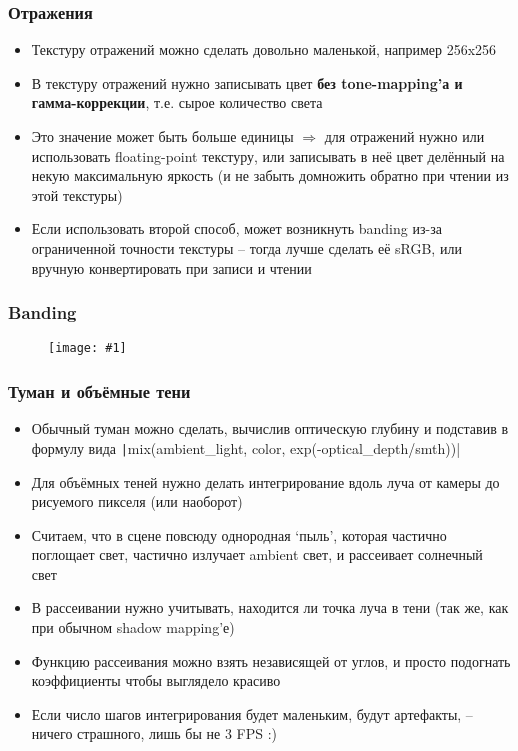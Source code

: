 \documentclass[10pt]{beamer}
\newcommand{\slideimage}[1]{
  \begin{figure}
    \begin{adjustbox}{width=\textwidth, totalheight=\textheight-2\baselineskip-2\baselineskip,keepaspectratio}
      \texttt{[image: \#1]}
    \end{adjustbox}
  \end{figure}
}
\begin{document}
\begin{frame}[fragile]
\frametitle{Отражения}
\begin{itemize}
\item Текстуру отражений можно сделать довольно маленькой, например 256x256
\pause
\item В текстуру отражений нужно записывать цвет \textbf{без tone-mapping'а и гамма-коррекции}, т.е. сырое количество света
\pause
\item Это значение может быть больше единицы \begin{math}\Longrightarrow\end{math} для отражений нужно или использовать floating-point текстуру, или записывать в неё цвет делённый на некую максимальную яркость (и не забыть домножить обратно при чтении из этой текстуры)
\pause
\item Если использовать второй способ, может возникнуть banding из-за ограниченной точности текстуры -- тогда лучше сделать её sRGB, или вручную конвертировать при записи и чтении
\end{itemize}
\end{frame}

\begin{frame}[fragile]
\frametitle{Banding}
\slideimage{banding.png}
\end{frame}

\begin{frame}[fragile]
\frametitle{Туман и объёмные тени}
\begin{itemize}
\item Обычный туман можно сделать, вычислив оптическую глубину и подставив в формулу вида \texttt|mix(ambient_light, color, exp(-optical_depth/smth))|
\pause
\item Для объёмных теней нужно делать интегрирование вдоль луча от камеры до рисуемого пикселя (или наоборот)
\pause
\item Считаем, что в сцене повсюду однородная `пыль', которая частично поглощает свет, частично излучает ambient свет, и рассеивает солнечный свет
\pause
\item В рассеивании нужно учитывать, находится ли точка луча в тени (так же, как при обычном shadow mapping'е)
\pause
\item Функцию рассеивания можно взять независящей от углов, и просто подогнать коэффициенты чтобы выглядело красиво
\pause
\item Если число шагов интегрирования будет маленьким, будут артефакты, -- ничего страшного, лишь бы не 3 FPS :)
\end{itemize}
\end{frame}
\end{document}
